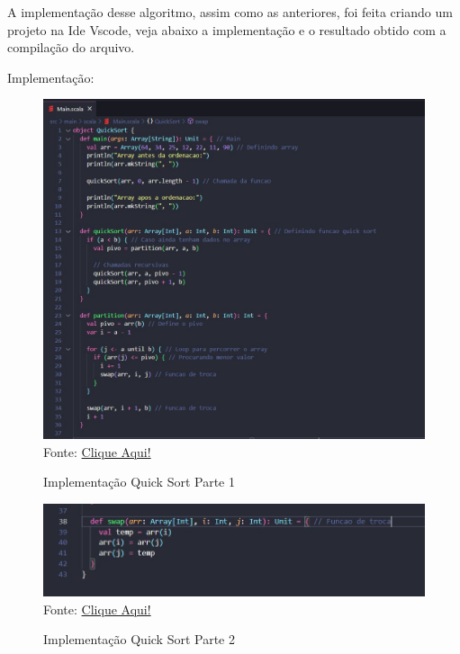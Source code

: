 	A implementação desse algoritmo, assim como as anteriores, foi feita criando um projeto na Ide Vscode, veja abaixo a implementação e o resultado obtido com a compilação do arquivo.
	
	Implementação:
	
	\begin{figure}[H]
		\centering
		\caption{Implementação Quick Sort Parte 1}
		\label{Implementação Quick Sort Parte 1}
		\includegraphics[width=17cm]{Pictures/Quick1.jpg} \\
		Fonte: \href{https://stackoverflow.com/questions/67182087/scala-quicksort-algorithm-implementationi}{Clique Aqui!}
	\end{figure}

	 \begin{figure}[H]
	 	\centering
	 	\caption{Implementação Quick Sort Parte 2}
	 	\label{Implementação Quick Sort Parte 2}
	 	\includegraphics[width=12cm]{Pictures/Quick2.jpg} \\
	 	Fonte: \href{https://stackoverflow.com/questions/67182087/scala-quicksort-algorithm-implementationi}{Clique Aqui!}
	 \end{figure}
 
